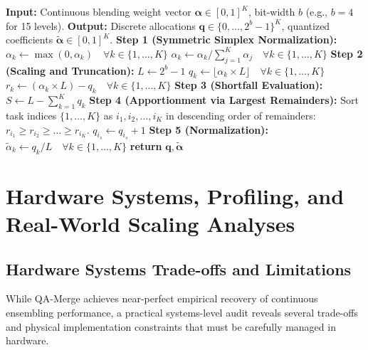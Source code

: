 \documentclass{article}
\theoremstyle{plain}
\theoremstyle{definition}
\theoremstyle{remark}
\begin{document}
\begin{algorithm}[H]
\caption{Discrete Simplex Projection (Hamilton's Method)}
\label{alg:discretesimplex}
\begin{algorithmic}[1]
\STATE \textbf{Input:} Continuous blending weight vector $\boldsymbol{\alpha} \in [0, 1]^K$, bit-width $b$ (e.g., $b=4$ for 15 levels).
\STATE \textbf{Output:} Discrete allocations $\mathbf{q} \in \{0, \dots, 2^b-1\}^K$, quantized coefficients $\tilde{\boldsymbol{\alpha}} \in [0, 1]^K$.
\STATE \textbf{Step 1 (Symmetric Simplex Normalization):}
\STATE $\alpha_k \leftarrow \max(0, \alpha_k) \quad \forall k \in \{1, \dots, K\}$
\STATE $\alpha_k \leftarrow \alpha_k / \sum_{j=1}^K \alpha_j \quad \forall k \in \{1, \dots, K\}$
\STATE \textbf{Step 2 (Scaling and Truncation):}
\STATE $L \leftarrow 2^b - 1$
\STATE $q_k \leftarrow \lfloor \alpha_k \times L \rfloor \quad \forall k \in \{1, \dots, K\}$
\STATE $r_k \leftarrow (\alpha_k \times L) - q_k \quad \forall k \in \{1, \dots, K\}$
\STATE \textbf{Step 3 (Shortfall Evaluation):}
\STATE $S \leftarrow L - \sum_{k=1}^K q_k$
\STATE \textbf{Step 4 (Apportionment via Largest Remainders):}
\STATE Sort task indices $\{1, \dots, K\}$ as $i_1, i_2, \dots, i_K$ in descending order of remainders: $r_{i_1} \geq r_{i_2} \geq \dots \geq r_{i_K}$.
    \STATE $q_{i_s} \leftarrow q_{i_s} + 1$
\ENDFOR
\STATE \textbf{Step 5 (Normalization):}
\STATE $\tilde{\alpha}_k \leftarrow q_k / L \quad \forall k \in \{1, \dots, K\}$
\STATE \textbf{return} $\mathbf{q}, \tilde{\boldsymbol{\alpha}}$
\end{algorithmic}
\end{algorithm}

\section{Hardware Systems, Profiling, and Real-World Scaling Analyses}
\label{app:hardware_systems}

\subsection{Hardware Systems Trade-offs and Limitations}
While QA-Merge achieves near-perfect empirical recovery of continuous ensembling performance, a practical systems-level audit reveals several trade-offs and physical implementation constraints that must be carefully managed in hardware.
\end{document}
